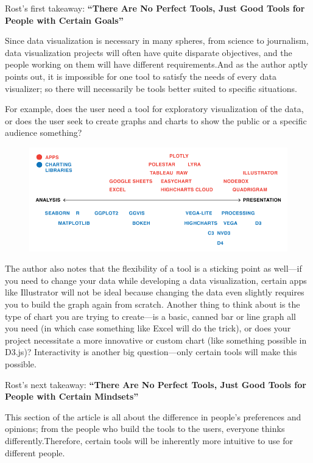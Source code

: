 \documentclass[]{book}
\theoremstyle{definition}
\theoremstyle{definition}
\theoremstyle{definition}
\theoremstyle{remark}
\begin{document}
Rost's first takeaway: \textbf{``There Are No Perfect Tools, Just Good
Tools for People with Certain Goals''}

Since data visualization is necessary in many spheres, from science to
journalism, data visualization projects will often have quite disparate
objectives, and the people working on them will have different
requirements.And as the author aptly points out, it is impossible for
one tool to satisfy the needs of every data visualizer; so there will
necessarily be tools better suited to specific situations.

For example, does the user need a tool for exploratory visualization of
the data, or does the user seek to create graphs and charts to show the
public or a specific audience something?

\begin{figure}
\centering
\includegraphics{images/analysis_spectrum.png}
\caption{}
\end{figure}

The author also notes that the flexibility of a tool is a sticking point
as well---if you need to change your data while developing a data
visualization, certain apps like Illustrator will not be ideal because
changing the data even slightly requires you to build the graph again
from scratch. Another thing to think about is the type of chart you are
trying to create---is a basic, canned bar or line graph all you need (in
which case something like Excel will do the trick), or does your project
necessitate a more innovative or custom chart (like something possible
in D3.js)? Interactivity is another big question---only certain tools
will make this possible.

Rost's next takeaway: \textbf{``There Are No Perfect Tools, Just Good
Tools for People with Certain Mindsets''}

This section of the article is all about the difference in people's
preferences and opinions; from the people who build the tools to the
users, everyone thinks differently.Therefore, certain tools will be
inherently more intuitive to use for different people.
\end{document}
